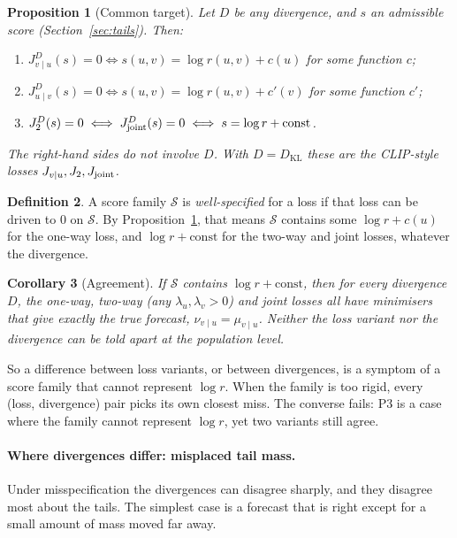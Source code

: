 \documentclass[11pt]{article}
\newcommand{\KL}{D_{\mathrm{KL}}}
\newcommand{\vu}{{v\mid u}}
\newcommand{\uv}{{u\mid v}}
\newcommand{\cS}{\mathcal{S}}
\theoremstyle{plain}
\newtheorem{proposition}{Proposition}
\newtheorem{corollary}[proposition]{Corollary}
\theoremstyle{definition}
\newtheorem{definition}[proposition]{Definition}
\theoremstyle{remark}
\begin{document}
\begin{proposition}[Common target]\label{prop:target}
Let $D$ be any divergence, and $s$ an admissible score (Section~\ref{sec:tails}). Then:
\begin{enumerate}[label=(\roman*)]
\item $J^D_\vu(s)=0 \iff s(u,v)=\log r(u,v)+c(u)$ for some function $c$;
\item $J^D_\uv(s)=0 \iff s(u,v)=\log r(u,v)+c'(v)$ for some function $c'$;
\item $J^D_2(s)=0 \iff J^D_{\rm joint}(s)=0 \iff s=\log r+\text{const}$.
\end{enumerate}
The right-hand sides do not involve $D$. With $D=\KL$ these are the CLIP-style losses
$J_\vu,J_2,J_{\rm joint}$.
\end{proposition}

\begin{definition}
A score family $\cS$ is \emph{well-specified} for a loss if that loss can be driven to $0$
on $\cS$. By Proposition~\ref{prop:target}, that means $\cS$ contains some $\log r+c(u)$ for
the one-way loss, and $\log r+\text{const}$ for the two-way and joint losses, whatever the
divergence.
\end{definition}

\begin{corollary}[Agreement]\label{cor:agree}
If $\cS$ contains $\log r+\text{const}$, then for every divergence $D$, the one-way, two-way
(any $\lambda_u,\lambda_v>0$) and joint losses all have minimisers that give exactly the true
forecast, $\nu_\vu=\mu_\vu$. Neither the loss variant nor the divergence can be told apart at
the population level.
\end{corollary}

So a difference between loss variants, or between divergences, is a symptom of a score
family that cannot represent $\log r$. When the family is too rigid, every (loss,
divergence) pair picks its own closest miss. The converse fails: P3 is a case where the
family cannot represent $\log r$, yet two variants still agree.

\paragraph{Where divergences differ: misplaced tail mass.} Under misspecification the
divergences can disagree sharply, and they disagree most about the tails. The simplest case
is a forecast that is right except for a small amount of mass moved far away.
\end{document}
